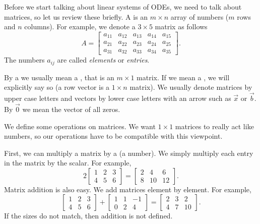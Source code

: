 Before we start talking about linear systems of ODEs, we need to
talk about matrices, so let us review these briefly.  A \emph{}
is an $m
\times n$ array of numbers ($m$ rows and $n$ columns).  For example, we denote
a $3 \times 5$ matrix as follows
\begin{equation*}
A = 
\begin{bmatrix}
a_{11} & a_{12} & a_{13} & a_{14} & a_{15} \\
a_{21} & a_{22} & a_{23} & a_{24} & a_{25} \\
a_{31} & a_{32} & a_{33} & a_{34} & a_{35}
\end{bmatrix} .
\end{equation*}
The numbers $a_{ij}$ are called \emph{elements}
or \emph{entries}.

By a \emph{} we usually mean a
\emph{}, that is an $m \times 1$ matrix.
If we mean a \emph{},
we will explicitly say so (a row vector is a $1 \times n$ matrix).
We usually denote
matrices by upper case letters and vectors by lower case letters with an
arrow such as $\vec{x}$ or $\vec{b}$.  By $\vec{0}$ we mean the vector
of all zeros.

We define some operations on matrices.  We 
want $1 \times 1$ matrices to really act like numbers, so our operations
have to be compatible with this viewpoint.

First, we can multiply a matrix by
a \emph{} (a number).
We simply multiply each entry in the matrix by the scalar.  For example,
\begin{equation*}
2
\begin{bmatrix}
1 & 2 & 3 \\
4 & 5 & 6
\end{bmatrix} =
\begin{bmatrix}
2 & 4 & 6 \\
8 & 10 & 12
\end{bmatrix} .
\end{equation*}
Matrix addition is also easy.
We add matrices element by element.
For example,
\begin{equation*}
\begin{bmatrix}
1 & 2 & 3 \\
4 & 5 & 6
\end{bmatrix} +
\begin{bmatrix}
1 & 1 & -1 \\
0 & 2 & 4
\end{bmatrix}
=
\begin{bmatrix}
2 & 3 & 2 \\
4 & 7 & 10
\end{bmatrix} .
\end{equation*}
If the sizes do not match, then addition is not defined.

